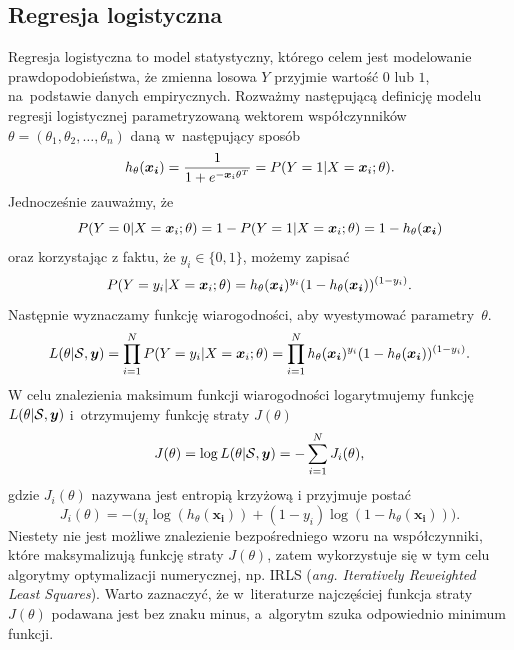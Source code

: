 \documentclass[inzynierska]{pwr_wmat_praca_dyplomowa}
\theoremstyle{plain}
\numberwithin{theorem}{chapter}
\theoremstyle{definition}
\numberwithin{theorem}{chapter}
\begin{document}
\subsection{Regresja logistyczna}
\label{reg-log}
Regresja logistyczna to model statystyczny, którego celem jest modelowanie prawdopodobieństwa, że zmienna losowa $Y$ przyjmie wartość $0$ lub $1$, na~podstawie danych empirycznych. Rozważmy następującą definicję modelu regresji logistycznej parametryzowaną wektorem współczynników $\theta = (\theta_1, \theta_2, \dots, \theta_n)$ daną w~następujący sposób
\begin{equation}
	h_{\theta}(\boldsymbol{x_i}) = \frac{1}{1+e^{-\boldsymbol{x}_{i}\theta^T}} = P(Y = 1|X = \boldsymbol{x}_{i};\theta) \text{.}
\end{equation} 
Jednocześnie zauważmy, że
$$ P(Y = 0|X = \boldsymbol{x}_{i};\theta) = 1 - P(Y = 1|X = \boldsymbol{x}_{i};\theta) = 1 - h_{\theta}(\boldsymbol{x_i}) $$
oraz korzystając z faktu, że $y_i \in \{0,1\}$, możemy zapisać 
$$ P(Y = y_i|X = \boldsymbol{x}_{i};\theta) = h_{\theta}(\boldsymbol{x_i})^{y_i}(1-h_{\theta}(\boldsymbol{x_i}))^{(1-y_i)} \text{.}$$
Następnie wyznaczamy funkcję wiarogodności, aby wyestymować parametry~$\theta$.
$$ L(\theta | \mathcal{S}, \boldsymbol{y}) = \prod_{i=1}^N P(Y = y_i | X = \boldsymbol{x}_{i}; \theta) = \prod_{i=1}^N h_{\theta}(\boldsymbol{x_i})^{y_i}(1-h_{\theta}(\boldsymbol{x_i}))^{(1-y_i)} \text{.}$$
W celu znalezienia maksimum funkcji wiarogodności logarytmujemy funkcję $L(\theta | \mathcal{S}, \boldsymbol{y})$ i~otrzymujemy funkcję straty $J(\theta)$
$$ J(\theta) = \log L(\theta | \mathcal{S}, \boldsymbol{y})  = -\sum_{i=1}^N J_i(\theta)\text{,}$$
gdzie $J_i(\theta)$ nazywana jest entropią krzyżową i przyjmuje postać
\begin{equation}
	\label{c-e}
	J_i(\theta) = -\big(y_i\log(h_{\theta}(\boldsymbol{x_i})) + (1-y_i)\log(1 - h_{\theta}(\boldsymbol{x_i}))\big) \text{.}
\end{equation}
Niestety nie jest możliwe znalezienie bezpośredniego wzoru na współczynniki, które maksymalizują funkcję straty $J(\theta)$, zatem wykorzystuje się w tym celu algorytmy optymalizacji numerycznej, np. IRLS (\textit{ang. Iteratively Reweighted Least Squares}). Warto zaznaczyć, że w~literaturze najczęściej funkcja straty $J(\theta)$ podawana jest bez znaku minus, a~algorytm szuka odpowiednio minimum funkcji.
\end{document}
